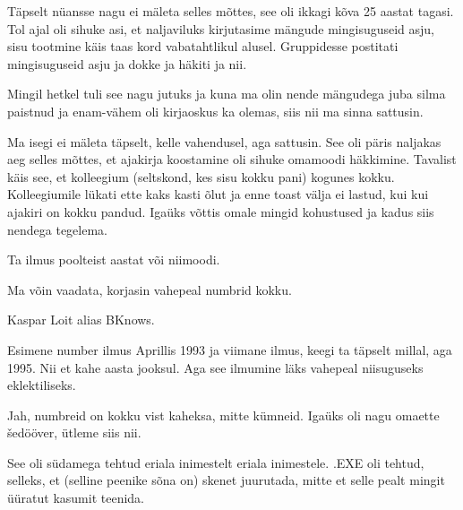 
Täpselt nüansse nagu ei mäleta selles mõttes, see oli ikkagi kõva 25 aastat 
tagasi. Tol ajal oli sihuke asi, et naljaviluks kirjutasime mängude 
mingisuguseid asju, sisu tootmine käis taas kord vabatahtlikul alusel. 
Gruppidesse postitati mingisuguseid asju ja dokke ja häkiti ja nii. 


Mingil hetkel tuli see nagu jutuks ja kuna ma olin nende mängudega juba silma 
paistnud ja enam-vähem oli kirjaoskus ka olemas, siis nii ma sinna sattusin. 

Ma isegi ei mäleta täpselt, kelle vahendusel, aga sattusin. See oli päris 
naljakas aeg selles mõttes, et ajakirja koostamine oli sihuke omamoodi 
häkkimine. Tavalist käis see, et kolleegium (seltskond, kes sisu kokku pani) 
kogunes kokku. Kolleegiumile lükati ette kaks kasti õlut ja enne toast välja ei 
lastud, kui kui ajakiri on kokku pandud. Igaüks võttis omale mingid kohustused 
ja kadus siis nendega tegelema.


Ta ilmus poolteist aastat või niimoodi.


Ma võin vaadata, korjasin vahepeal numbrid kokku.


Kaspar Loit alias BKnows.

Esimene number ilmus Aprillis 1993 ja viimane ilmus, keegi ta täpselt millal, 
aga 1995. Nii et kahe aasta jooksul. Aga see ilmumine läks vahepeal niisuguseks 
eklektiliseks.


Jah, numbreid on kokku vist kaheksa, mitte kümneid. Igaüks oli nagu omaette 
šedööver, ütleme siis nii.


See oli südamega tehtud eriala inimestelt eriala inimestele. .EXE oli tehtud, 
selleks, et (selline peenike sõna on) skenet juurutada, mitte et selle pealt 
mingit üüratut kasumit teenida. 

